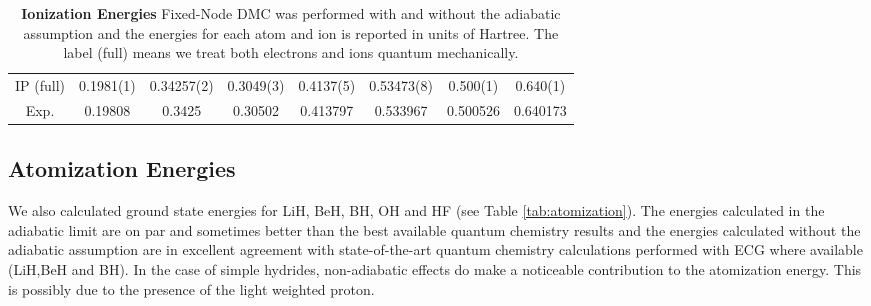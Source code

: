 \documentclass[aps,prl,superscriptaddress,groupedaddress]{revtex4}
\begin{document}
\begin{table*}[htpb!]
\begin{tabular}{*{1}{*{8}{c}}}
IP (full) & 0.1981(1) & 0.34257(2) & 0.3049(3) & 0.4137(5) & 0.53473(8) & 0.500(1) & 0.640(1) \\
Exp. \cite{Davidson_Atoms} & 0.19808 & 0.3425 & 0.30502 & 0.413797 & 0.533967 & 0.500526 & 0.640173 \\
\hline
\end{tabular}
\caption{\textbf{Ionization Energies} Fixed-Node DMC was performed with and without the adiabatic assumption and the energies for each atom and ion is reported in units of Hartree. The label (full) means we treat both electrons and ions quantum mechanically. \label{tab:ionization}}
\end{table*}
 
\subsection{Atomization Energies}
We also calculated ground state energies for LiH, BeH, BH, OH and HF (see Table \ref{tab:atomization}). The energies calculated in the adiabatic limit are on par and sometimes better than the best available quantum chemistry results \cite{Adamowicz_LiH,Koput_BeH,Miliordos_BH} and the energies calculated without the adiabatic assumption are in excellent agreement with state-of-the-art quantum chemistry calculations performed with ECG where available (LiH,BeH and BH). In the case of simple hydrides, non-adiabatic effects do make a noticeable contribution to the atomization energy. This is possibly due to the presence of the light weighted proton.
 
\end{document}
